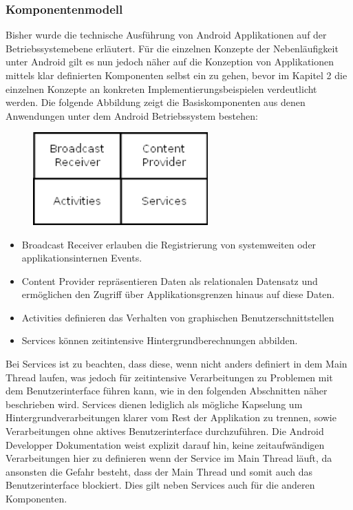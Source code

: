 \documentclass[12pt,oneside,a4paper,bibtotoc,liststotoc]{scrreprt}
\begin{document}
\subsubsection{Komponentenmodell}
Bisher wurde die technische Ausführung von Android Applikationen auf der Betriebssystemebene erläutert. Für die einzelnen Konzepte der Nebenläufigkeit unter Android gilt es nun jedoch näher auf die Konzeption von Applikationen mittels klar definierten Komponenten selbst ein zu gehen, bevor im Kapitel 2 die einzelnen Konzepte an konkreten Implementierungsbeispielen verdeutlicht werden. Die folgende Abbildung zeigt die Basiskomponenten aus denen Anwendungen unter dem Android Betriebssystem bestehen:
\begin{figure}[H]
  \begin{centering}
    \includegraphics[width=0.6\textwidth]{img/Android_Komponent_Model.png}
    \label{Android_Komponent_Model}
  \end{centering}
\end{figure}
\begin{itemize}
\item Broadcast Receiver erlauben die Registrierung von systemweiten oder applikationsinternen Events.
\item Content Provider repräsentieren Daten als relationalen Datensatz und ermöglichen den Zugriff über Applikationsgrenzen hinaus auf diese Daten.
\item Activities definieren das Verhalten von graphischen Benutzerschnittstellen
\item Services können zeitintensive Hintergrundberechnungen abbilden. 
\end{itemize}
Bei Services ist zu beachten, dass diese, wenn nicht anders definiert in dem Main Thread laufen, was jedoch für zeitintensive Verarbeitungen zu Problemen mit dem Benutzerinterface führen kann, wie in den folgenden Abschnitten näher beschrieben wird. Services dienen lediglich als mögliche Kapselung um Hintergrundverarbeitungen klarer vom Rest der Applikation zu trennen, sowie Verarbeitungen ohne aktives Benutzerinterface durchzuführen. Die Android Developper Dokumentation weist explizit darauf hin, keine zeitaufwändigen Verarbeitungen hier zu definieren wenn der Service im Main Thread läuft, da ansonsten die Gefahr besteht, dass der Main Thread und somit auch das Benutzerinterface blockiert. Dies gilt neben Services auch für die anderen Komponenten.
\end{document}
